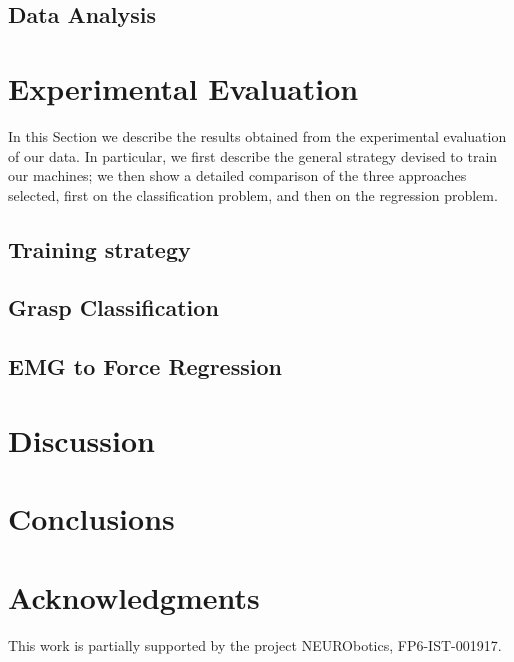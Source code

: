 \documentclass[conference,letterpaper]{IEEEtran}
\begin{document}
\subsection{Data Analysis}
\label{subsec:analysis}


\section{Experimental Evaluation}
\label{sec:exp}

In this Section we describe the results obtained from the experimental
evaluation of our data. In particular, we first describe the general
strategy devised to train our machines; we then show a detailed
comparison of the three approaches selected, first on the
classification problem, and then on the regression problem.

\subsection{Training strategy}
\label{subsec:strategy}


\subsection{Grasp Classification}
\label{subsec:classification}


\subsection{EMG to Force Regression}
\label{subsec:regression}


\section{Discussion}
\label{sec:discussion}


\section{Conclusions}
\label{sec:conclusions}



\section*{Acknowledgments}

This work is partially supported by the project NEURObotics,
FP6-IST-001917.
\end{document}
